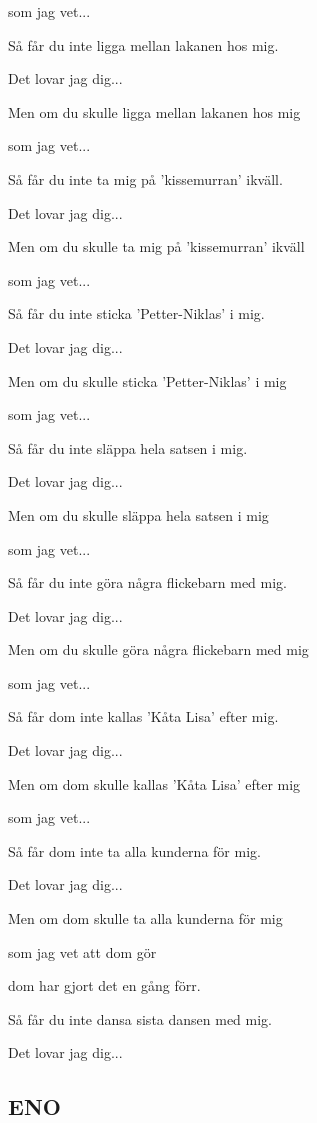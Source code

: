 som jag vet...

Så får du inte ligga mellan lakanen hos mig.

Det lovar jag dig...\bigskip


Men om du skulle ligga mellan lakanen hos mig

som jag vet...

Så får du inte ta mig på 'kissemurran' ikväll.

Det lovar jag dig...\bigskip


Men om du skulle ta mig på 'kissemurran' ikväll

som jag vet...

Så får du inte sticka 'Petter-Niklas' i mig.

Det lovar jag dig... \bigskip


Men om du skulle sticka 'Petter-Niklas' i mig

som jag vet...

Så får du inte släppa hela satsen i mig.

Det lovar jag dig...\bigskip


Men om du skulle släppa hela satsen i mig

som jag vet...

Så får du inte göra några flickebarn med mig.

Det lovar jag dig...\bigskip


Men om du skulle göra några flickebarn med mig

som jag vet...

Så får dom inte kallas 'Kåta Lisa' efter mig.

Det lovar jag dig...\bigskip


Men om dom skulle kallas 'Kåta Lisa' efter mig

som jag vet...

Så får dom inte ta alla kunderna för mig.

Det lovar jag dig...\bigskip


Men om dom skulle ta alla kunderna för mig

som jag vet att dom gör

dom har gjort det en gång förr.

Så får du inte dansa sista dansen med mig.

Det lovar jag dig... \bigskip


\subsection{\textbf{ENO}}

